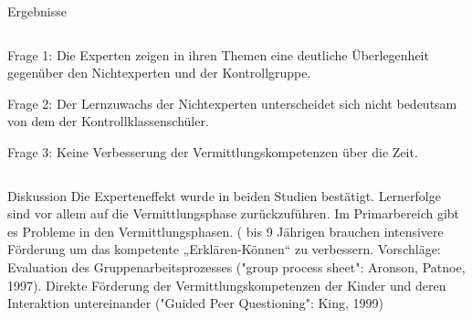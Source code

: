 \begin{block}{Ergebnisse}
\begin{columns}[t,totalwidth=\twocolwid]
\begin{column}{\onecolwid}
\justifying
Frage 1: Die Experten zeigen in ihren Themen eine deutliche Überlegenheit gegenüber den Nichtexperten und der Kontrollgruppe.

Frage 2: Der Lernzuwachs der Nichtexperten unterscheidet sich nicht bedeutsam von dem der Kontrollklassenschüler.

Frage 3: Keine Verbesserung der Vermittlungskompetenzen über die Zeit.
\end{column}

\end{columns}
\end{block}

\begin{block}{Diskussion}
Die Experteneffekt wurde in beiden Studien bestätigt. Lernerfolge sind vor allem auf die Vermittlungsphase zurückzuführen. Im Primarbereich gibt es Probleme in den Vermittlungsphasen. ( bis 9 Jährigen brauchen intensivere Förderung um das kompetente „Erklären-Können“ zu verbessern. Vorschläge: Evaluation des Gruppenarbeitsprozesses ("group process sheet": Aronson, Patnoe, 1997). Direkte Förderung der Vermittlungskompetenzen der Kinder und deren Interaktion untereinander ("Guided Peer Questioning": King, 1999)
\end{block}
